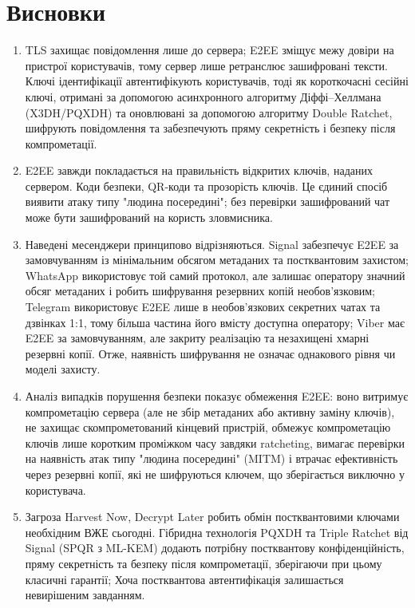 \section{Висновки}
\label{sec:conclusions}

\begin{enumerate}
    \item TLS захищає повідомлення лише до сервера; E2EE зміщує межу довіри на пристрої користувачів, тому сервер 
        лише ретранслює зашифровані тексти. Ключі ідентифікації автентифікують користувачів, тоді як короткочасні 
        сесійні ключі, отримані за допомогою асинхронного алгоритму Діффі–Хеллмана (X3DH/PQXDH) та оновлювані за 
        допомогою алгоритму Double Ratchet, шифрують повідомлення та забезпечують пряму секретність і безпеку 
        після компрометації.
    \item E2EE завжди покладається на правильність відкритих ключів, наданих сервером. Коди безпеки, QR-коди та 
    прозорість ключів. Це єдиний спосіб виявити атаку типу "людина посередині"{}; без перевірки зашифрований чат 
    може бути зашифрований на користь зловмисника.
    \item Наведені месенджери принципово відрізняються. Signal забезпечує E2EE за замовчуванням із мінімальним 
        обсягом метаданих та постквантовим захистом; WhatsApp використовує той самий протокол, але залишає оператору 
        значний обсяг метаданих і робить шифрування резервних копій необов’язковим; Telegram використовує E2EE 
        лише в необов’язкових секретних чатах та дзвінках 1:1, тому більша частина його вмісту доступна оператору; 
        Viber має E2EE за замовчуванням, але закриту реалізацію та незахищені хмарні резервні копії. Отже, наявність 
        шифрування не означає однакового рівня чи моделі захисту.
    \item Аналіз випадків порушення безпеки показує обмеження E2EE: воно витримує компрометацію сервера (але не 
        збір метаданих або активну заміну ключів), не захищає скомпрометований кінцевий пристрій, обмежує компрометацію 
        ключів лише коротким проміжком часу завдяки ratcheting, вимагає перевірки на наявність атак типу "людина посередині"{} 
        (MITM) і втрачає ефективність через резервні копії, які не шифруються ключем, що зберігається виключно у користувача.
    \item Загроза Harvest Now, Decrypt Later робить обмін постквантовими ключами необхідним ВЖЕ сьогодні. Гібридна 
        технологія PQXDH та Triple Ratchet від Signal (SPQR з ML-KEM) додають потрібну постквантову конфіденційність, 
        пряму секретність та безпеку після компрометації, зберігаючи при цьому класичні гарантії; Хоча постквантова 
        автентифікація залишається невирішеним завданням.
\end{enumerate}
